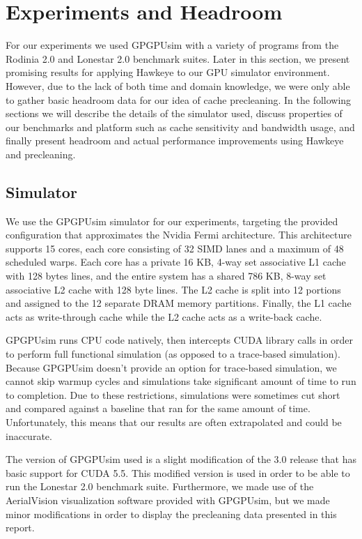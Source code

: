 \chapter{Experiments and Headroom}

For our experiments we used GPGPUsim with a variety of programs from the Rodinia 2.0 \cite{rodinia} and Lonestar 2.0 \cite{lonestar} benchmark suites. Later in this section, we present promising results for applying Hawkeye to our GPU simulator environment. However, due to the lack of both time and domain knowledge, we were only able to gather basic headroom data for our idea of cache precleaning. In the following sections we will describe the details of the simulator used, discuss properties of our benchmarks and platform such as cache sensitivity and bandwidth usage, and finally present headroom and actual performance improvements using Hawkeye and precleaning.

\section{Simulator}
We use the GPGPUsim \cite{gpgpusim} simulator for our experiments, targeting the provided configuration that approximates the Nvidia Fermi architecture. This architecture supports 15 cores, each core consisting of 32 SIMD lanes and a maximum of 48 scheduled warps. Each core has a private 16 KB, 4-way set associative L1 cache with 128 bytes lines, and the entire system has a shared 786 KB, 8-way set associative L2 cache with 128 byte lines. The L2 cache is split into 12 portions and assigned to the 12 separate DRAM memory partitions. Finally, the L1 cache acts as write-through cache while the L2 cache acts as a write-back cache.

GPGPUsim runs CPU code natively, then intercepts CUDA library calls in order to perform full functional simulation (as opposed to a trace-based simulation). Because GPGPUsim doesn’t provide an option for trace-based simulation, we cannot skip warmup cycles and simulations take significant amount of time to run to completion. Due to these restrictions, simulations were sometimes cut short and compared against a baseline that ran for the same amount of time. Unfortunately, this means that our results are often extrapolated and could be inaccurate.

The version of GPGPUsim used is a slight modification of the 3.0 release that has basic support for CUDA 5.5. This modified version is used in order to be able to run the Lonestar 2.0 benchmark suite. Furthermore, we made use of the AerialVision \cite{aerialvision} visualization software provided with GPGPUsim, but we made minor modifications in order to display the precleaning data presented in this report.

